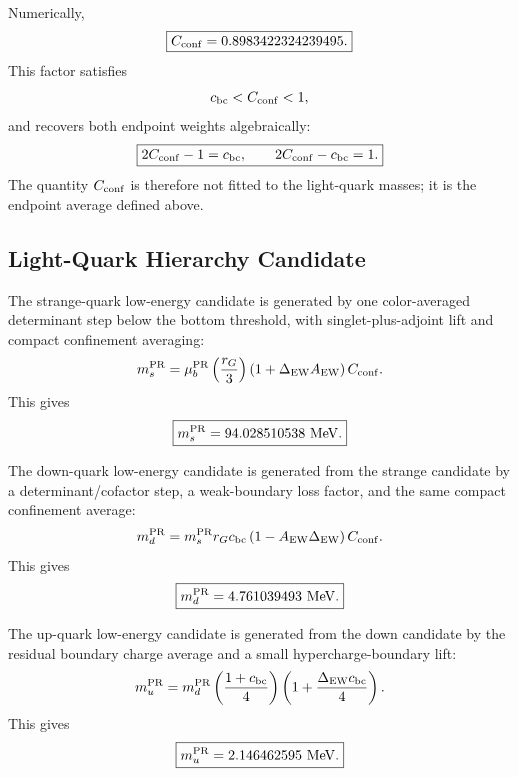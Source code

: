 \documentclass[11pt]{article}
\begin{document}
Numerically,
\begin{equation}
\boxed{
C_{\rm conf}
=
0.8983422324239495.
}
\end{equation}
This factor satisfies
\begin{equation}
c_{\rm bc}<C_{\rm conf}<1,
\end{equation}
and recovers both endpoint weights algebraically:
\begin{equation}
\boxed{
2C_{\rm conf}-1=c_{\rm bc},
\qquad
2C_{\rm conf}-c_{\rm bc}=1.
}
\end{equation}
The quantity \(C_{\rm conf}\) is therefore not fitted to the light-quark masses; it is the endpoint average defined above.

\subsection{Light-Quark Hierarchy Candidate}
\label{sec:pr2_light_quark_hierarchy_candidate}

The strange-quark low-energy candidate is generated by one color-averaged determinant step below the bottom threshold, with singlet-plus-adjoint lift and compact confinement averaging:
\begin{equation}
m_s^{\rm PR}
=
\mu_b^{\rm PR}
\left(
\frac{r_G}{3}
\right)
\left(
1+\Delta_{\rm EW}A_{\rm EW}
\right)
C_{\rm conf}.
\end{equation}
This gives
\begin{equation}
\boxed{
m_s^{\rm PR}
=
94.028510538\ {\rm MeV}.
}
\end{equation}

The down-quark low-energy candidate is generated from the strange candidate by a determinant/cofactor step, a weak-boundary loss factor, and the same compact confinement average:
\begin{equation}
m_d^{\rm PR}
=
m_s^{\rm PR}
r_Gc_{\rm bc}
\left(
1-A_{\rm EW}\Delta_{\rm EW}
\right)
C_{\rm conf}.
\end{equation}
This gives
\begin{equation}
\boxed{
m_d^{\rm PR}
=
4.761039493\ {\rm MeV}.
}
\end{equation}

The up-quark low-energy candidate is generated from the down candidate by the residual boundary charge average and a small hypercharge-boundary lift:
\begin{equation}
m_u^{\rm PR}
=
m_d^{\rm PR}
\left(
\frac{1+c_{\rm bc}}{4}
\right)
\left(
1+
\frac{\Delta_{\rm EW}c_{\rm bc}}{4}
\right).
\end{equation}
This gives
\begin{equation}
\boxed{
m_u^{\rm PR}
=
2.146462595\ {\rm MeV}.
}
\end{equation}
\end{document}
